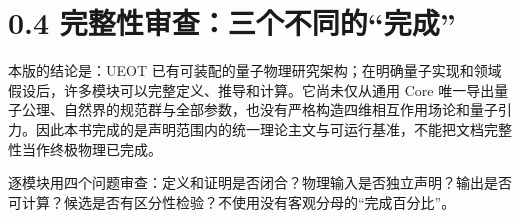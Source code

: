 \documentclass[
  11pt,
  oneside]{book}
\begin{document}
\hypertarget{ux5b8cux6574ux6027ux5ba1ux67e5ux4e09ux4e2aux4e0dux540cux7684ux5b8cux6210}{%
\section{0.4
完整性审查：三个不同的``完成''}\label{ux5b8cux6574ux6027ux5ba1ux67e5ux4e09ux4e2aux4e0dux540cux7684ux5b8cux6210}}

本版的结论是：UEOT
已有可装配的量子物理研究架构；在明确量子实现和领域假设后，许多模块可以完整定义、推导和计算。它尚未仅从通用
Core
唯一导出量子公理、自然界的规范群与全部参数，也没有严格构造四维相互作用场论和量子引力。因此本书完成的是声明范围内的统一理论主文与可运行基准，不能把文档完整性当作终极物理已完成。

逐模块用四个问题审查：定义和证明是否闭合？物理输入是否独立声明？输出是否可计算？候选是否有区分性检验？不使用没有客观分母的``完成百分比''。
\end{document}
